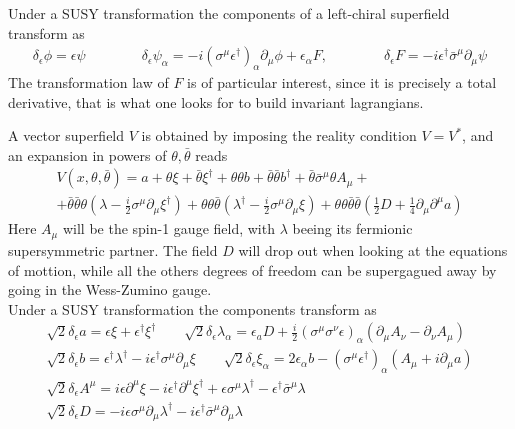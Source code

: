 \documentclass[12pt]{article}
\begin{document}
Under a SUSY transformation the components of a left-chiral superfield transform as 
\begin{gather*}
  \delta_{\epsilon} \phi =\epsilon \psi \qquad\qquad
  \delta_{\epsilon} \psi_{\alpha} =-i\left(\sigma^{\mu} \epsilon^{\dagger}\right)_{\alpha} \partial_{\mu} \phi+\epsilon_{\alpha} F, \qquad\qquad
  \delta_{\epsilon} F =-i \epsilon^{\dagger} \bar{\sigma}^{\mu} \partial_{\mu} \psi
\end{gather*}
The transformation law of $F$ is of particular interest, since it is precisely a total derivative, that is what one looks for to build invariant lagrangians. \par
\vspace{15pt}
\raggedright A vector superfield $V$ is obtained by imposing the reality condition $V=V^*$, and an expansion in powers of $\theta, \bar\theta$ reads
\begin{gather*}
  V\left(x, \theta, \bar\theta\right) = a+\theta \xi+\bar\theta \xi^{\dagger} +\theta \theta b+\bar\theta \bar\theta b^{\dagger}+\bar\theta \bar{\sigma}^{\mu} \theta A_{\mu}+ \\ 
                + \bar\theta \bar\theta \theta\left(\lambda-\frac{i}{2} \sigma^{\mu} \partial_{\mu} \xi^{\dagger}\right)
                +\theta \theta \bar\theta\left(\lambda^{\dagger}-\frac{i}{2} \sigma^{\mu} \partial_{\mu} \xi\right)+\theta \theta \bar\theta \bar\theta \left(\frac{1}{2} D+\frac{1}{4} \partial_{\mu} \partial^{\mu} a\right)
\end{gather*}
Here $A_\mu$ will be the spin-1 gauge field, with $\lambda$ beeing its fermionic supersymmetric partner. The field $D$ will drop out when looking at the equations of mottion, while all the others degrees of freedom can be supergagued away by going in the Wess-Zumino gauge. \\
Under a SUSY transformation the components transform as 
\begin{gather*}
  \sqrt{2} \delta_{\epsilon} a =\epsilon \xi+\epsilon^{\dagger} \xi^{\dagger} \qquad 
  \sqrt{2} \delta_{\epsilon} \lambda_{\alpha} =\epsilon_{a} D+\frac{i}{2}\left(\sigma^{\mu} \sigma^{\nu} \epsilon\right)_{\alpha}\left(\partial_{\mu} A_{\nu}-\partial_{\nu} A_{\mu}\right) \\
  \sqrt{2} \delta_{\epsilon} b =\epsilon^{\dagger} \lambda^{\dagger}-i \epsilon^{\dagger} \sigma^{\mu} \partial_{\mu} \xi \qquad
  \sqrt{2} \delta_{\epsilon} \xi_{\alpha} =2 \epsilon_{\alpha} b-\left(\sigma^{\mu} \epsilon^{\dagger}\right)_{\alpha}\left(A_{\mu}+i \partial_{\mu} a\right) \\
  \sqrt{2} \delta_{\epsilon} A^{\mu} =i \epsilon \partial^{\mu} \xi-i \epsilon^{\dagger} \partial^{\mu} \xi^{\dagger}+\epsilon \sigma^{\mu} \lambda^{\dagger}-\epsilon^{\dagger} \bar{\sigma}^{\mu} \lambda \\
  \sqrt{2} \delta_{\epsilon} D =-i \epsilon \sigma^{\mu} \partial_{\mu} \lambda^{\dagger}-i \epsilon^{\dagger} \bar{\sigma}^{\mu} \partial_{\mu} \lambda
\end{gather*}
\end{document}
